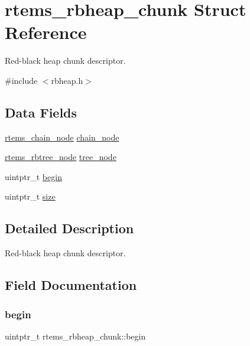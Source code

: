 \hypertarget{structrtems__rbheap__chunk}{}\section{rtems\+\_\+rbheap\+\_\+chunk Struct Reference}
\label{structrtems__rbheap__chunk}


Red-\/black heap chunk descriptor.  




{\ttfamily \#include $<$rbheap.\+h$>$}

\subsection*{Data Fields}
\begin{DoxyCompactItemize}
\item 
\mbox{\hyperlink{structChain__Node__struct}{rtems\+\_\+chain\+\_\+node}} \mbox{\hyperlink{structrtems__rbheap__chunk_a90db6a3d0682d916970e68d748478bb5}{chain\+\_\+node}}
\item 
\mbox{\hyperlink{group__ClassicRBTrees_gaef47fc7fc61856c9afbf7f18a26ff80d}{rtems\+\_\+rbtree\+\_\+node}} \mbox{\hyperlink{structrtems__rbheap__chunk_ae87ec9bb978c75ad6feceed2eb0f3785}{tree\+\_\+node}}
\item 
uintptr\+\_\+t \mbox{\hyperlink{structrtems__rbheap__chunk_abaf4fac36ba9dab9618e159c2c20c810}{begin}}
\item 
uintptr\+\_\+t \mbox{\hyperlink{structrtems__rbheap__chunk_a00639c28a15cc063da3de4cd9fdac830}{size}}
\end{DoxyCompactItemize}


\subsection{Detailed Description}
Red-\/black heap chunk descriptor. 

\subsection{Field Documentation}
\mbox{\label{structrtems__rbheap__chunk_abaf4fac36ba9dab9618e159c2c20c810}} 
\subsubsection{\texorpdfstring{begin}{begin}}
{\footnotesize\ttfamily uintptr\+\_\+t rtems\+\_\+rbheap\+\_\+chunk\+::begin}

